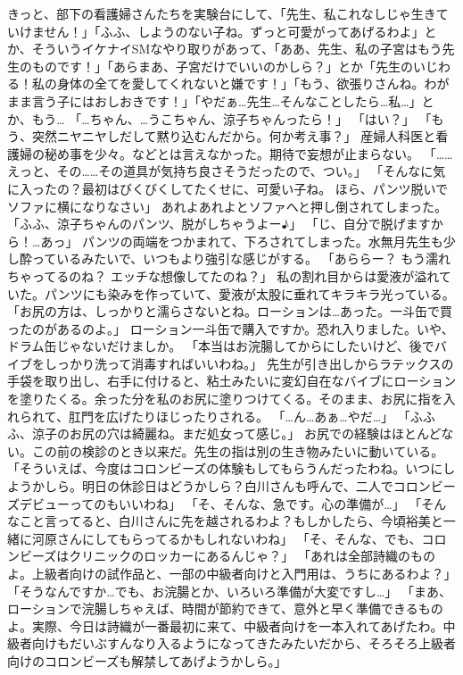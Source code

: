 きっと、部下の看護婦さんたちを実験台にして、「先生、私これなしじゃ生きていけません！」「ふふ、しようのない子ね。ずっと可愛がってあげるわよ」とか、そういうイケナイSMなやり取りがあって、「ああ、先生、私の子宮はもう先生のものです！」「あらまあ、子宮だけでいいのかしら？」とか「先生のいじわる！私の身体の全てを愛してくれないと嫌です！」「もう、欲張りさんね。わがまま言う子にはおしおきです！」「やだぁ…先生…そんなことしたら…私…」とか、もう…
「…ちゃん、…うこちゃん、涼子ちゃんったら！」
「はい？」
「もう、突然ニヤニヤしだして黙り込むんだから。何か考え事？」
産婦人科医と看護婦の秘め事を少々。などとは言えなかった。期待で妄想が止まらない。
「……えっと、その……その道具が気持ち良さそうだったので、つい。」
「そんなに気に入ったの？最初はびくびくしてたくせに、可愛い子ね。 ほら、パンツ脱いでソファに横になりなさい」
あれよあれよとソファへと押し倒されてしまった。
「ふふ、涼子ちゃんのパンツ、脱がしちゃうよー♪」
「じ、自分で脱げますから！…あっ」
パンツの両端をつかまれて、下ろされてしまった。水無月先生も少し酔っているみたいで、いつもより強引な感じがする。
「あららー？ もう濡れちゃってるのね？ エッチな想像してたのね？」
私の割れ目からは愛液が溢れていた。パンツにも染みを作っていて、愛液が太股に垂れてキラキラ光っている。
「お尻の方は、しっかりと濡らさないとね。ローションは…あった。一斗缶で買ったのがあるのよ。」
ローション一斗缶で購入ですか。恐れ入りました。いや、ドラム缶じゃないだけましか。
「本当はお浣腸してからにしたいけど、後でバイブをしっかり洗って消毒すればいいわね。」
先生が引き出しからラテックスの手袋を取り出し、右手に付けると、粘土みたいに変幻自在なバイブにローションを塗りたくる。余った分を私のお尻に塗りつけてくる。そのまま、お尻に指を入れられて、肛門を広げたりほじったりされる。
「…ん…あぁ…やだ…」
「ふふふ、涼子のお尻の穴は綺麗ね。まだ処女って感じ。」
お尻での経験はほとんどない。この前の検診のとき以来だ。先生の指は別の生き物みたいに動いている。
「そういえば、今度はコロンビーズの体験もしてもらうんだったわね。いつにしようかしら。明日の休診日はどうかしら？白川さんも呼んで、二人でコロンビーズデビューってのもいいわね」
「そ、そんな、急です。心の準備が…」
「そんなこと言ってると、白川さんに先を越されるわよ？もしかしたら、今頃裕美と一緒に河原さんにしてもらってるかもしれないわね」
「そ、そんな、でも、コロンビーズはクリニックのロッカーにあるんじゃ？」
「あれは全部詩織のものよ。上級者向けの試作品と、一部の中級者向けと入門用は、うちにあるわよ？」
「そうなんですか…でも、お浣腸とか、いろいろ準備が大変ですし…」
「まあ、ローションで浣腸しちゃえば、時間が節約できて、意外と早く準備できるものよ。実際、今日は詩織が一番最初に来て、中級者向けを一本入れてあげたわ。中級者向けもだいぶすんなり入るようになってきたみたいだから、そろそろ上級者向けのコロンビーズも解禁してあげようかしら。」
